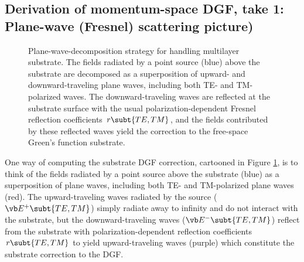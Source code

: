 \documentclass[letterpaper]{article}
\begin{document}
\subsection{Derivation of momentum-space DGF, take 1: Plane-wave (Fresnel) scattering picture)}
\label{PlaneWaveSection}

\begin{figure}
\begin{center}
\caption{Plane-wave-decomposition strategy for handling 
multilayer substrate. The fields radiated by a point source (blue)
above the substrate are decomposed as a superposition of
upward- and downward-traveling plane waves, including 
both TE- and TM-polarized waves. The downward-traveling waves
are reflected at the substrate surface with the usual
polarization-dependent Fresnel reflection coefficients $r\subt{TE,TM}$,
and the fields contributed by these reflected waves
yield the correction to the free-space Green's function
substrate.
}
\label{PlaneWaveFigure}
\end{center}
\end{figure}

One way of computing the substrate DGF 
correction, cartooned in Figure \ref{PlaneWaveFigure}, is
to think of the fields radiated by a point source above
the substrate (blue) as a superposition of 
plane waves, including both TE- and TM-polarized
plane waves (red). The upward-traveling waves radiated by the 
source ($\vb E^+\subt{TE,TM}$) simply radiate away to 
infinity and do not interact with the substrate, but the
downward-traveling waves
($\vb E^-\subt{TE,TM}$) reflect from the substrate 
with polarization-dependent reflection coefficients
$r\subt{TE,TM}$ to yield upward-traveling waves (purple)
which constitute the substrate correction to the DGF.
\end{document}
